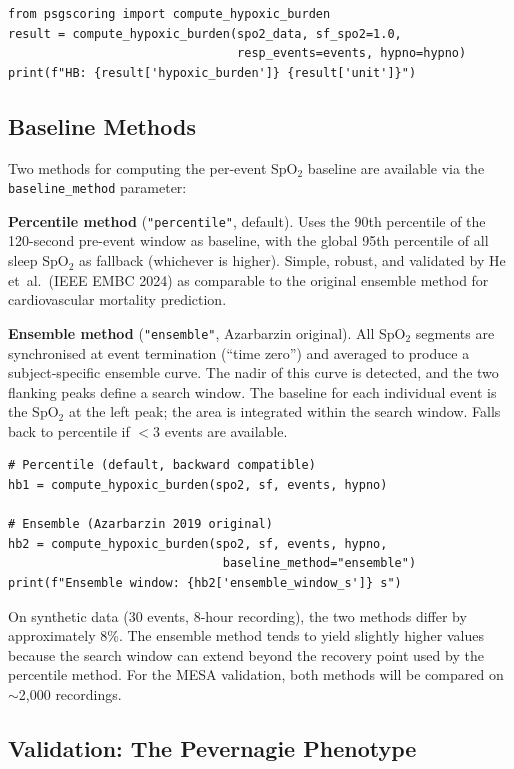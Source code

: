 \documentclass[11pt,a4paper]{article}
\begin{document}
\begin{lstlisting}
from psgscoring import compute_hypoxic_burden
result = compute_hypoxic_burden(spo2_data, sf_spo2=1.0,
                                resp_events=events, hypno=hypno)
print(f"HB: {result['hypoxic_burden']} {result['unit']}")
\end{lstlisting}

\subsection{Baseline Methods}

Two methods for computing the per-event SpO$_2$ baseline are available
via the \texttt{baseline\_method} parameter:

\textbf{Percentile method} (\texttt{"percentile"}, default).
Uses the 90th percentile of the 120-second pre-event window as
baseline, with the global 95th percentile of all sleep SpO$_2$ as
fallback (whichever is higher). Simple, robust, and validated by
He et~al.\ (IEEE EMBC 2024) as comparable to the original ensemble
method for cardiovascular mortality prediction.

\textbf{Ensemble method} (\texttt{"ensemble"}, Azarbarzin original).
All SpO$_2$ segments are synchronised at event termination (``time
zero'') and averaged to produce a subject-specific ensemble curve.
The nadir of this curve is detected, and the two flanking peaks define
a search window.  The baseline for each individual event is the SpO$_2$
at the left peak; the area is integrated within the search window.
Falls back to percentile if $<$3 events are available.

\begin{lstlisting}
# Percentile (default, backward compatible)
hb1 = compute_hypoxic_burden(spo2, sf, events, hypno)

# Ensemble (Azarbarzin 2019 original)
hb2 = compute_hypoxic_burden(spo2, sf, events, hypno,
                              baseline_method="ensemble")
print(f"Ensemble window: {hb2['ensemble_window_s']} s")
\end{lstlisting}

On synthetic data (30 events, 8-hour recording), the two methods
differ by approximately 8\%.  The ensemble method tends to yield
slightly higher values because the search window can extend beyond
the recovery point used by the percentile method.  For the MESA
validation, both methods will be compared on $\sim$2,000 recordings.

\subsection{Validation: The Pevernagie Phenotype}
\end{document}
